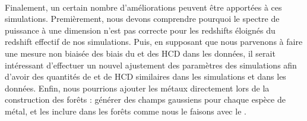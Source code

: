 \paragraph{}
Finalement, un certain nombre d'améliorations peuvent être apportées à ces simulations. Premièrement, nous devons comprendre pourquoi le spectre de puissance à une dimension n'est pas correcte pour les redshifts éloignés du redshift effectif de nos simulations.
Puis, en supposant que nous parvenons à faire une mesure non biaisée des biais du \lya{} et des HCD dans les données, il serait intéressant d'effectuer un nouvel ajustement des paramètres des simulations afin d'avoir des quantités de \lya{} et de HCD similaires dans les simulations et dans les données.
Enfin, nous pourrions ajouter les métaux directement lors de la construction des forêts \lya{} : générer des champs gaussiens pour chaque espèce de métal, et les inclure dans les forêts comme nous le faisons avec le \lya{}.
